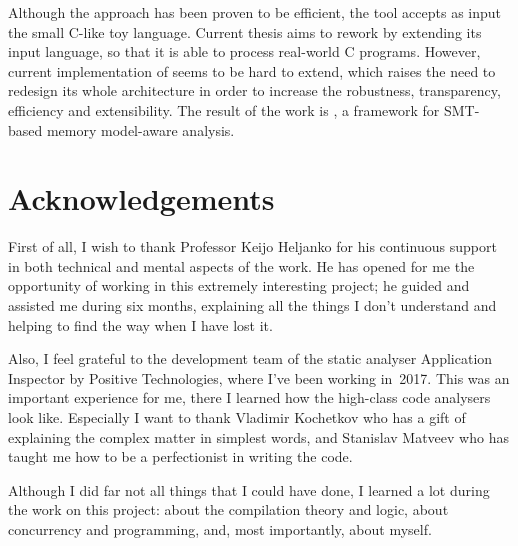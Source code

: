 \documentclass[12pt,a4paper,oneside,pdftex]{report}
\begin{document}
{Although the approach has been proven to be efficient, the tool accepts as input the small C-like toy language. %
Current thesis aims to rework \porthos{} by extending its input language, so that it is able to process real-world C programs.
However, current implementation of \porthos{} seems to be hard to extend, which raises the need to redesign its whole architecture in order to increase the robustness, transparency, efficiency and extensibility.
The result of the work is \textit{\porthos[2]}, a framework for SMT-based memory model-aware analysis.
}


\chapter*{Acknowledgements}
First of all, I wish to thank Professor Keijo Heljanko for his continuous support in both technical and mental aspects of the work.
He has opened for me the opportunity of working in this extremely interesting project; he guided and assisted me during six months, explaining all the things I don't understand and helping to find the way when I have lost it.

Also, I feel grateful to the development team of the static analyser Application Inspector by Positive Technologies, where I've been working in~2017.
This was an important experience for me, there I learned how the high-class code analysers look like.
Especially I want to thank Vladimir Kochetkov who has a gift of explaining the complex matter in simplest words, and Stanislav Matveev who has taught me how to be a perfectionist in writing the code.

Although I did far not all things that I could have done, I learned a lot during the work on this project: about the compilation theory and logic, about concurrency and programming, and, most importantly, about myself.
\end{document}
